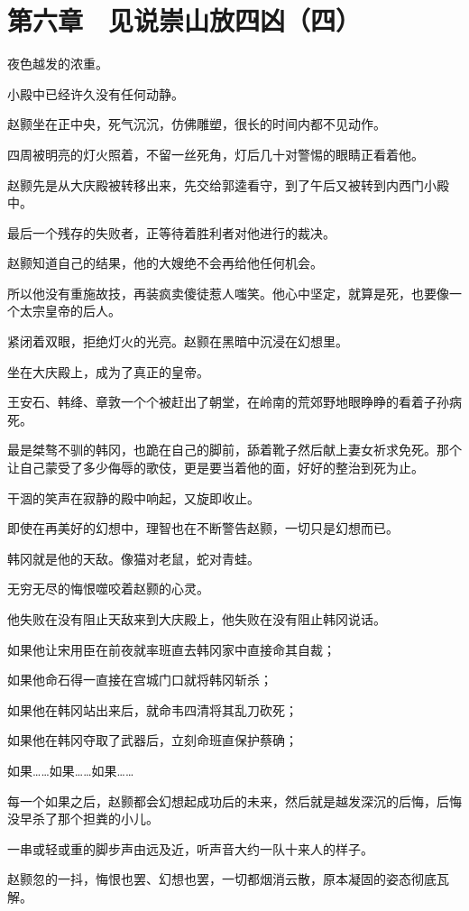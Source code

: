 \section{第六章　见说崇山放四凶（四）}

夜色越发的浓重。

小殿中已经许久没有任何动静。

赵颢坐在正中央，死气沉沉，仿佛雕塑，很长的时间内都不见动作。

四周被明亮的灯火照着，不留一丝死角，灯后几十对警惕的眼睛正看着他。

赵颢先是从大庆殿被转移出来，先交给郭逵看守，到了午后又被转到内西门小殿中。

最后一个残存的失败者，正等待着胜利者对他进行的裁决。

赵颢知道自己的结果，他的大嫂绝不会再给他任何机会。

所以他没有重施故技，再装疯卖傻徒惹人嗤笑。他心中坚定，就算是死，也要像一个太宗皇帝的后人。

紧闭着双眼，拒绝灯火的光亮。赵颢在黑暗中沉浸在幻想里。

坐在大庆殿上，成为了真正的皇帝。

王安石、韩绛、章敦一个个被赶出了朝堂，在岭南的荒郊野地眼睁睁的看着子孙病死。

最是桀骜不驯的韩冈，也跪在自己的脚前，舔着靴子然后献上妻女祈求免死。那个让自己蒙受了多少侮辱的歌伎，更是要当着他的面，好好的整治到死为止。

干涸的笑声在寂静的殿中响起，又旋即收止。

即使在再美好的幻想中，理智也在不断警告赵颢，一切只是幻想而已。

韩冈就是他的天敌。像猫对老鼠，蛇对青蛙。

无穷无尽的悔恨噬咬着赵颢的心灵。

他失败在没有阻止天敌来到大庆殿上，他失败在没有阻止韩冈说话。

如果他让宋用臣在前夜就率班直去韩冈家中直接命其自裁；

如果他命石得一直接在宫城门口就将韩冈斩杀；

如果他在韩冈站出来后，就命韦四清将其乱刀砍死；

如果他在韩冈夺取了武器后，立刻命班直保护蔡确；

如果……如果……如果……

每一个如果之后，赵颢都会幻想起成功后的未来，然后就是越发深沉的后悔，后悔没早杀了那个担粪的小儿。

一串或轻或重的脚步声由远及近，听声音大约一队十来人的样子。

赵颢忽的一抖，悔恨也罢、幻想也罢，一切都烟消云散，原本凝固的姿态彻底瓦解。

